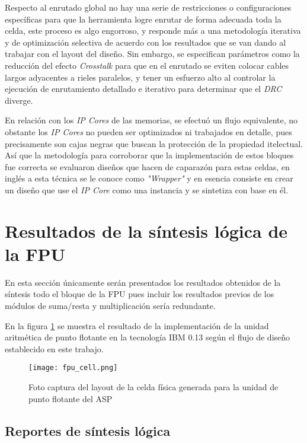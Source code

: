Respecto al enrutado global no hay una serie de restricciones o configuraciones específicas para que la herramienta logre enrutar de forma adecuada toda la celda, este proceso es algo engorroso, y responde más a una metodología iterativa y de optimización selectiva de acuerdo con los resultados que se van dando al trabajar con el layout del diseño. Sin embargo, se especifican parámetros como la reducción del efecto \textit{Crosstalk} para que en el enrutado se eviten colocar cables largos adyacentes a rieles paralelos, y tener un esfuerzo alto al controlar la ejecución de enrutamiento detallado e iterativo para determinar que el \textit{DRC} diverge.

En relación con los \textit{IP Cores} de las memorias, se efectuó un flujo equivalente, no obstante los \textit{IP Cores} no pueden ser optimizados ni trabajados en detalle, pues precisamente son cajas negras que buscan la protección de la propiedad itelectual. Así que la metodología para corroborar que la implementación de estos bloques fue correcta se evaluaron diseños que hacen de caparazón para estas celdas, en inglés a esta técnica se le conoce como \textit{"Wrapper"} y en esencia consiste en crear un diseño que use el \textit{IP Core} como una instancia y se sintetiza con base en él.

\section{Resultados de la síntesis lógica de la FPU}
\label{sec:fpu_syn_result}
En esta sección únicamente serán presentados los resultados obtenidos de la síntesis todo el bloque de la FPU pues incluir los resultados previos de los módulos de suma/resta y multiplicación sería redundante.

En la figura \ref{fig:fpu_cell} se muestra el resultado de la implementación de la unidad aritmética de punto flotante en la tecnología IBM 0.13 según el flujo de diseño establecido en este trabajo.

\begin{figure}[h]
\texttt{[image: fpu\_cell.png]}
\centering
\caption{Foto captura del layout de la celda física generada para la unidad de punto flotante del ASP}
\label{fig:fpu_cell}
\end{figure}

\subsection{Reportes de síntesis lógica}
\label{s_sec:fpu_syn_report}

